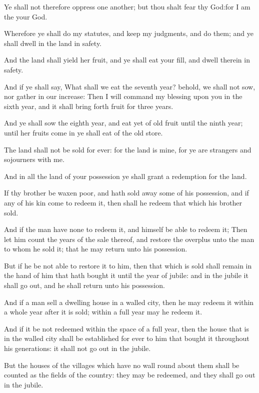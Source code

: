 \verse Ye shall not therefore oppress one another; but thou shalt fear thy God:for I am the \LORD your God.

\verse Wherefore ye shall do my statutes, and keep my judgments, and do them; and ye shall dwell in the land in safety.

\verse And the land shall yield her fruit, and ye shall eat your fill, and dwell therein in safety.

\verse And if ye shall say, What shall we eat the seventh year? behold, we shall not sow, nor gather in our increase: \verse Then I will command my blessing upon you in the sixth year, and it shall bring forth fruit for three years.

\verse And ye shall sow the eighth year, and eat yet of old fruit until the ninth year; until her fruits come in ye shall eat of the old store.

\verse The land shall not be sold for ever: for the land is mine, for ye are strangers and sojourners with me.

\verse And in all the land of your possession ye shall grant a redemption for the land.

\verse If thy brother be waxen poor, and hath sold away some of his possession, and if any of his kin come to redeem it, then shall he redeem that which his brother sold.

\verse And if the man have none to redeem it, and himself be able to redeem it; \verse Then let him count the years of the sale thereof, and restore the overplus unto the man to whom he sold it; that he may return unto his possession.

\verse But if he be not able to restore it to him, then that which is sold shall remain in the hand of him that hath bought it until the year of jubile: and in the jubile it shall go out, and he shall return unto his possession.

\verse And if a man sell a dwelling house in a walled city, then he may redeem it within a whole year after it is sold; within a full year may he redeem it.

\verse And if it be not redeemed within the space of a full year, then the house that is in the walled city shall be established for ever to him that bought it throughout his generations: it shall not go out in the jubile.

\verse But the houses of the villages which have no wall round about them shall be counted as the fields of the country: they may be redeemed, and they shall go out in the jubile.


